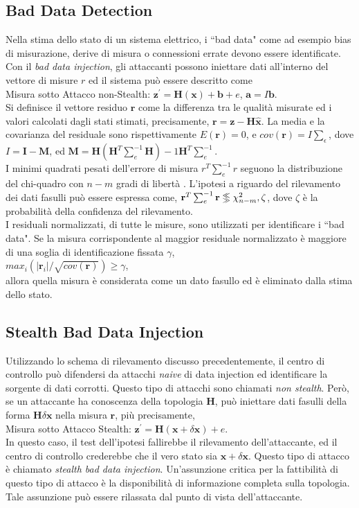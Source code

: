 \subsection{Bad Data Detection}
Nella stima dello stato di un sistema elettrico, i ``bad data" come ad esempio bias di misurazione, derive di misura o connessioni errate devono essere identificate. Con il \emph{bad data injection}, gli attaccanti possono iniettare dati all'interno del vettore di misure $r$ ed il sistema può essere descritto come\\
\indent Misura sotto Attacco non-Stealth: $\textbf{z}^\prime = \textbf{H}(\textbf{x}) + \textbf{b} + e$, $\textbf{a} = I\textbf{b}$.\\
Si definisce il vettore residuo $\textbf{r}$ come la differenza tra le qualità misurate ed i valori calcolati dagli stati stimati, precisamente, $\textbf{r} = \textbf{z} - \textbf{H}\widehat{\textbf{x}}$. La media e la covarianza del residuale sono rispettivamente $E(\textbf{r}) = 0$, e $cov(\textbf{r}) = I\sum_{\epsilon}$, dove $I = \textbf{I} - \textbf{M}$, ed $\textbf{M} = \textbf{H}(\textbf{H}^T\sum_e^{-1}\textbf{H})-1\textbf{H}^T\sum_e^{-1}$.\\
I minimi quadrati pesati dell'errore di misura $r^{T}\sum_{e}^{-1}r$ seguono la distribuzione del chi-quadro con $n - m$ gradi di libertà \cite{monticelli}. L'ipotesi a riguardo del rilevamento dei dati fasulli può essere espressa come, $\textbf{r}^T\sum_{e}^{-1}\textbf{r} \ggll \chi_{n-m}^{2},\zeta$, dove $\zeta$ è la probabilità della confidenza del rilevamento.\\
I residuali normalizzati, di tutte le misure, sono utilizzati per identificare i ``bad data". Se la misura corrispondente al maggior residuale normalizzato è maggiore di una soglia di identificazione fissata $\gamma$, \\
\indent $max_i(|\textbf{r}_i|/\sqrt{cov(\textbf{r})}) \geq \gamma$,\\
allora quella misura è considerata come un dato fasullo ed è eliminato dalla stima dello stato.
\subsection{Stealth Bad Data Injection}
Utilizzando lo schema di rilevamento discusso precedentemente, il centro di controllo può difendersi da attacchi \emph{naive} di data injection ed identificare la sorgente di dati corrotti. Questo tipo di attacchi sono chiamati \emph{non stealth}. Però, se un attaccante ha conoscenza della topologia \textbf{H}, può iniettare dati fasulli della forma $\textbf{H}\delta\textbf{x}$ nella misura $\textbf{r}$, più precisamente,\\
\indent Misura sotto Attacco Stealth: $\textbf{z}^\prime = \textbf{H}(\textbf{x} + \delta\textbf{x}) + e$.\\
In questo caso, il test dell'ipotesi fallirebbe il rilevamento dell'attaccante, ed il centro di controllo crederebbe che il vero stato sia $\textbf{x} + \delta\textbf{x}$. Questo tipo di attacco è chiamato \emph{stealth bad data injection}. Un'assunzione critica per la fattibilità di questo tipo di attacco è la disponibilità di informazione completa sulla topologia. Tale assunzione può essere rilassata dal punto di vista dell'attaccante.
